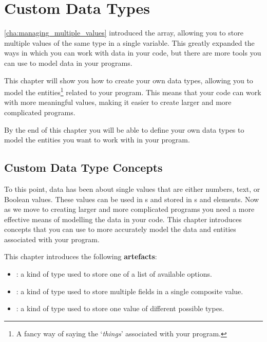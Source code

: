 \chapter{Custom Data Types} %
\label{cha:more_data_types}

\cref{cha:managing_multiple_values} introduced the array, allowing you to store multiple values of the same type in a single variable. This greatly expanded the ways in which you can work with data in your code, but there are more tools you can use to model data in your programs.

This chapter will show you how to create your own data types, allowing you to model the entities\footnote{A fancy way of saying the `\emph{things}' associated with your program.} related to your program. This means that your code can work with more meaningful values, making it easier to create larger and more complicated programs.

By the end of this chapter you will be able to define your own data types to model the entities you want to work with in your program.

\minitoc

\clearpage
\section{Custom Data Type Concepts} %
\label{sec:data_type_concepts}

To this point, data has been about single values that are either numbers, text, or Boolean values. These values can be used in s and stored in s and  elements. Now as we move to creating larger and more complicated programs you need a more effective means of modelling the data in your code. This chapter introduces concepts that you can use to more accurately model the data and entities associated with your program.

This chapter introduces the following \textbf{artefacts}:
\begin{itemize}
  \item {}: a kind of type used to store one of a list of available options.
  \item {}: a kind of type used to store multiple fields in a single composite value.
  \item {}: a kind of type used to store one value of different possible types.
\end{itemize}

